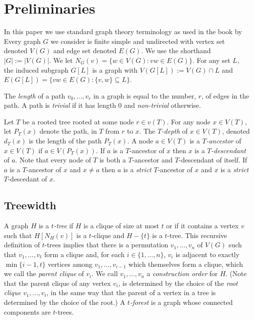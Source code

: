 \documentclass[kpfonts]{patmorin}
\theoremstyle{named}
\begin{document}
\section{Preliminaries}

In this paper we use standard graph theory terminology as used in the book by \citet{diestel:graph}
Every graph $G$ we consider is finite simple and undirected with vertex set denoted $V(G)$ and edge set denoted $E(G)$.  We use the shorthand $|G|:=|V(G)|$.
We let $N_G(v)=\{w\in V(G): vw\in E(G)\}$.
For any set $L$, the induced subgraph  $G[L]$ is a graph with $V(G[L]):=V(G)\cap L$ and $E(G[L])=\{vw\in E(G): \{v,w\}\subseteq L\}$.

The \emph{length} of a path $v_0,\ldots,v_r$ in a graph is equal to the number, $r$, of edges in the path. A path is \emph{trivial} if it has length 0 and \emph{non-trivial} otherwise.

Let $T$ be a rooted tree rooted at some node $r\in v(T)$.  For any node $x\in V(T)$, let $P_T(x)$ denote the path, in $T$ from $r$ to $x$.  The \emph{$T$-depth} of $x\in V(T)$, denoted $d_T(x)$ is the length of the path $P_T(x)$.  A node $a\in V(T)$ is a \emph{$T$-ancestor} of $x\in V(T)$ if $a\in V(P_T(x))$. If $a$ is a $T$-ancestor of $x$ then $x$ is a \emph{$T$-descendant} of $a$.  Note that every node of $T$ is both a $T$-ancestor and $T$-descendant of itself.  If $a$ is a $T$-ancestor of $x$ and $x\neq a$ then $a$ is a \emph{strict} $T$-ancestor of $x$ and $x$ is a \emph{strict} $T$-descedant of $x$.

\subsection{Treewidth}

A graph $H$ is a \emph{$t$-tree} if $H$ is a clique of size at most $t$ or if it contains a vertex $v$ such that $H[N_H(v)]$ is a $t$-clique and $H-\{t\}$ is a $t$-tree.  This recursive definition of $t$-trees implies that there is a permutation $v_1,\ldots,v_n$ of $V(G)$ such that $v_1,\ldots,v_t$ form a clique and, for each $i\in\{1,\ldots,n\}$, $v_i$ is adjacent to exactly $\min\{i-1,t\}$ vertices among $v_1,\ldots,v_{i-1}$ which themselves form a clique, which we call the \emph{parent clique} of $v_i$.  We call $v_1,\ldots,v_n$ a \emph{construction order} for $H$.  (Note that the parent clique of any vertex $v_i$, is determined by the choice of the \emph{root clique} $v_1,\ldots,v_t$, in the same way that the parent of a vertex in a tree is determined by the choice of the root.)  A \emph{$t$-forest} is a graph whose connected components are $t$-trees.
\end{document}
